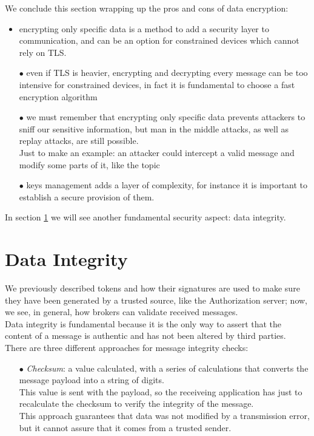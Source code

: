 \documentclass[12pt]{report}
\begin{document}
{{We conclude this section wrapping up the pros and cons of data encryption:

\begin{itemize}
\setlength{\itemindent}{+4mm}
\item encrypting only specific data is a method to add a security layer to communication, and can be an option for constrained devices which cannot rely on TLS.
\item[$\bullet$] even if TLS is heavier, encrypting and decrypting every message can be too intensive for constrained devices, in fact it is fundamental to choose a fast encryption algorithm
\item[$\bullet$] we must remember that encrypting only specific data prevents attackers to sniff our sensitive information, but man in the middle attacks, as well as replay attacks, are still possible.\\ 
Just to make an example: an attacker could intercept a valid message and modify some parts of it, like the topic
\item[$\bullet$] keys management adds a layer of complexity, for instance it is important to establish a secure provision of them.
\end{itemize}
\bigskip
In section \ref{sec:dataintegrity} we will see another fundamental security aspect: data integrity.\\

\clearpage
\section{Data Integrity}
\label{sec:dataintegrity}
\bigskip

We previously described tokens and how their signatures are used to make sure they have been generated by a trusted source, like the Authorization server; now, we see, in general, how brokers can validate received messages.\\
Data integrity is fundamental because it is the only way to assert that the content of a message is authentic and has not been altered by third parties.\\
There are three different approaches for message integrity checks:

\begin{itemize}
\setlength{\itemindent}{+4mm}
\item[$\bullet$] \emph{Checksum}: a value calculated, with a series of calculations that converts the message payload into a string of digits.\\
This value is sent with the payload, so the receiveing application has just to recalculate the checksum to verify the integrity of the message.\\
This approach guarantees that data was not modified by a transmission error, but it cannot assure that it comes from a trusted sender.


\end{itemize}}}
\end{document}
